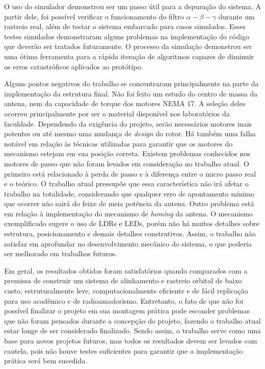 O uso do simulador demonstrou ser um passo útil para a depuração do sistema.
A partir dele, foi possível verificar o funcionamento do filtro $\alpha-\beta-\gamma$ durante um rastreio real, além de testar o sistema embarcado para casos simulados.
Esses testes simulados demonstraram alguns problemas na implementação do código que deverão ser tratados futuramente.
O processo da simulação demonstrou ser uma ótima ferramenta para a rápida iteração de algoritmos capazes de diminuir os erros catastróficos aplicados ao protótipo.

Alguns pontos negativos do trabalho se concentraram principalmente na parte da implementação da estrutura final.
Não foi feito um estudo do centro de massa da antena, nem da capacidade de torque dos motores NEMA 17.
A seleção deles ocorreu principalmente por ser o material disponível nos laboratórios da faculdade.
Dependendo da exigência do projeto, serão necessários motores mais potentes ou até mesmo uma mudança de \textit{design} do rotor.
Há também uma falha notável em relação às técnicas utilizadas para garantir que os motores do mecanismo estejam em sua posição correta.
Existem problemas conhecidos nos motores de passo que não foram levados em consideração no trabalho atual.
O primeiro está relacionado à perda de passo e à diferença entre o micro passo real e o teórico.
O trabalho atual pressupõe que essa característica não irá afetar o trabalho na totalidade, considerando que qualquer erro de apontamento mínimo que ocorrer não sairá do feixe de meia potência da antena.
Outro problema está em relação à implementação do mecanismo de \textit{homing} da antena. O mecanismo exemplificado sugere o uso de LDRs e LEDs, porém não há muitos detalhes sobre estrutura, posicionamento e demais detalhes construtivos.
Assim, o trabalho não satisfaz em aprofundar no desenvolvimento mecânico do sistema, o que poderia ser melhorado em trabalhos futuros.

Em geral, os resultados obtidos foram satisfatórios quando comparados com a premissa de construir um sistema de alinhamento e rastreio orbital de baixo custo, estruturalmente leve, computacionalmente eficiente e de fácil replicação para uso acadêmico e de radioamadorismo.
Entretanto, o fato de que não foi possível finalizar o projeto em sua montagem prática pode esconder problemas que não foram pensados durante a concepção do projeto, fazendo o trabalho atual estar longe de ser considerado finalizado.
Sendo assim, o trabalho serve como uma base para novos projetos futuros, mas todos os resultados devem ser levados com cautela, pois não houve testes suficientes para garantir que a implementação prática será bem sucedida.

